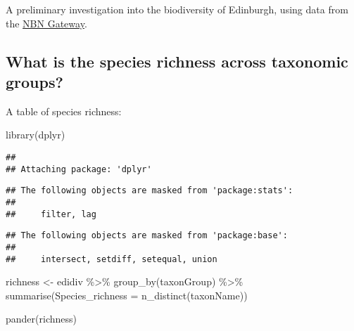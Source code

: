 \documentclass[
  12pt,
]{article}
\newenvironment{Shaded}{\begin{snugshade}}{\end{snugshade}}
\newcommand{\AttributeTok}[1]{\textcolor[rgb]{0.77,0.63,0.00}{#1}}
\newcommand{\FunctionTok}[1]{\textcolor[rgb]{0.00,0.00,0.00}{#1}}
\newcommand{\NormalTok}[1]{#1}
\newcommand{\OtherTok}[1]{\textcolor[rgb]{0.56,0.35,0.01}{#1}}
\newcommand{\SpecialCharTok}[1]{\textcolor[rgb]{0.00,0.00,0.00}{#1}}
\begin{document}
A preliminary investigation into the biodiversity of Edinburgh, using
data from the \href{https://data.nbn.org.uk/}{NBN Gateway}.

\hypertarget{what-is-the-species-richness-across-taxonomic-groups}{%
\subsection{What is the species richness across taxonomic
groups?}\label{what-is-the-species-richness-across-taxonomic-groups}}

A table of species richness:

\begin{Shaded}
\begin{Highlighting}[]
\FunctionTok{library}\NormalTok{(dplyr)}
\end{Highlighting}
\end{Shaded}

\begin{verbatim}
## 
## Attaching package: 'dplyr'
\end{verbatim}

\begin{verbatim}
## The following objects are masked from 'package:stats':
## 
##     filter, lag
\end{verbatim}

\begin{verbatim}
## The following objects are masked from 'package:base':
## 
##     intersect, setdiff, setequal, union
\end{verbatim}

\begin{Shaded}
\begin{Highlighting}[]
\NormalTok{richness }\OtherTok{\textless{}{-}} 
\NormalTok{  edidiv }\SpecialCharTok{\%\textgreater{}\%}
  \FunctionTok{group\_by}\NormalTok{(taxonGroup) }\SpecialCharTok{\%\textgreater{}\%}
  \FunctionTok{summarise}\NormalTok{(}\AttributeTok{Species\_richness =} \FunctionTok{n\_distinct}\NormalTok{(taxonName)) }

\FunctionTok{pander}\NormalTok{(richness)}
\end{Highlighting}
\end{Shaded}
\end{document}
